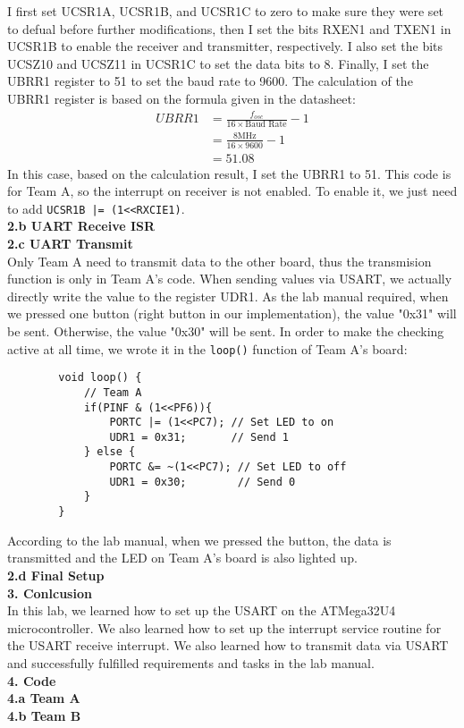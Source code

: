 \documentclass{report}
\begin{document}
    I first set UCSR1A, UCSR1B, and UCSR1C to zero to make sure they were set to defual before further modifications, then I set the bits RXEN1 and TXEN1 in UCSR1B to enable the receiver and transmitter, respectively. I also set the bits UCSZ10 and UCSZ11 in UCSR1C to set the data bits to 8. Finally, I set the UBRR1 register to 51 to set the baud rate to 9600. The calculation of the UBRR1 register is based on the formula given in the datasheet:
    \begin{align*}
        UBRR1 &= \frac{f_{osc}}{16 \times \text{Baud Rate}} - 1 \\
              &= \frac{8\text{MHz}}{16 \times 9600} - 1 \\
              &= 51.08
    \end{align*}
    In this case, based on the calculation result, I set the UBRR1 to 51. This code is for Team A, so the interrupt on receiver is not enabled. To enable it, we just need to add \texttt{UCSR1B |= (1<<RXCIE1)}.\\[1em]
{\Large \textbf{2.b UART Receive ISR}}\\[0.5em]
{\Large \textbf{2.c UART Transmit}}\\[0.5em]
    Only Team A need to transmit data to the other board, thus the transmision function is only in Team A's code. When sending values via USART, we actually directly write the value to the register UDR1. As the lab manual required, when we pressed one button (right button in our implementation), the value "0x31" will be sent. Otherwise, the value "0x30" will be sent. In order to make the checking active at all time, we wrote it in the \texttt{loop()} function of Team A's board:
    \begin{verbatim}
        void loop() {
            // Team A
            if(PINF & (1<<PF6)){
                PORTC |= (1<<PC7); // Set LED to on
                UDR1 = 0x31;       // Send 1
            } else {
                PORTC &= ~(1<<PC7); // Set LED to off
                UDR1 = 0x30;        // Send 0
            }
        } 
    \end{verbatim}
    According to the lab manual, when we pressed the button, the data is transmitted and the LED on Team A's board is also lighted up. \\[1em]
{\Large \textbf{2.d Final Setup}}\\[0.5em]
{\Large \textbf{3. Conlcusion}}\\[0.5em]
    In this lab, we learned how to set up the USART on the ATMega32U4 microcontroller. We also learned how to set up the interrupt service routine for the USART receive interrupt. We also learned how to transmit data via USART and successfully fulfilled requirements and tasks in the lab manual. \\[1em]
{\Large \textbf{4. Code}}\\[0.5em]
{\Large \textbf{4.a Team A}}\\[0.5em]
{\Large \textbf{4.b Team B}}\\[0.5em]
\end{document}

